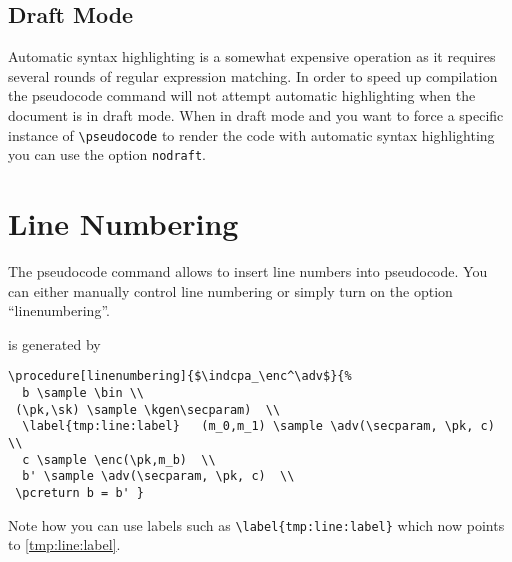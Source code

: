 \documentclass[a4paper]{report}
\begin{document}
\subsection{Draft Mode}
Automatic syntax highlighting is a somewhat expensive operation as it requires several rounds of regular expression matching.
In order to speed up compilation the pseudocode command will not attempt automatic highlighting when the document is in draft mode.
When in draft mode and you want to force a specific instance of \lstinline$\pseudocode$ to render the code with automatic syntax
highlighting you can use the option \lstinline$nodraft$.


\section{Line Numbering}
The pseudocode command allows to insert line numbers into pseudocode. You can either manually control line numbering or simply turn on the option
\enquote{linenumbering}.
\begin{center}
\end{center}
is generated by 
\begin{lstlisting}
\procedure[linenumbering]{$\indcpa_\enc^\adv$}{%
  b \sample \bin \\
 (\pk,\sk) \sample \kgen\secparam)  \\
  \label{tmp:line:label}   (m_0,m_1) \sample \adv(\secparam, \pk, c)  \\
  c \sample \enc(\pk,m_b)  \\
  b' \sample \adv(\secparam, \pk, c)  \\
 \pcreturn b = b' }
\end{lstlisting}
Note how you can use labels such as \lstinline$\label{tmp:line:label}$ which now points to \ref{tmp:line:label}.
\end{document}
